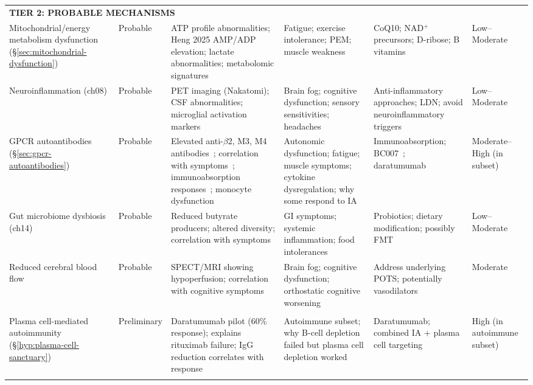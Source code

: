 \begin{landscape}
\begin{longtable}{p{2.8cm}p{1.8cm}p{4.3cm}p{4.3cm}p{3.9cm}p{2.2cm}}
\multicolumn{6}{l}{\textbf{TIER 2: PROBABLE MECHANISMS}} \\
\addlinespace

Mito\-chon\-drial/\allowbreak energy meta\-bolism dys\-func\-tion (\S\ref{sec:mitochondrial-dysfunction}) & Prob\-able & ATP profile ab\-nor\-mal\-ities; Heng 2025 AMP/\allowbreak ADP ele\-va\-tion; lac\-tate ab\-nor\-mal\-ities; meta\-bolomic sig\-na\-tures & Fa\-tigue; ex\-er\-cise in\-tol\-er\-ance; PEM; mus\-cle weak\-ness & CoQ10; NAD$^+$ pre\-cur\-sors; D-ri\-bose; B vi\-ta\-mins & Low--Moderate \\
\addlinespace

Neuroinflammation (ch08) & Probable & PET imaging (Nakatomi); CSF abnormalities; microglial activation markers & Brain fog; cognitive dysfunction; sensory sensitivities; headaches & Anti-inflammatory approaches; LDN; avoid neuroinflammatory triggers & Low--Moderate \\
\addlinespace

GPCR auto\-anti\-bodies (\S\ref{sec:gpcr-autoantibodies}) & Prob\-able & El\-e\-vat\-ed anti-$\beta$2, M3, M4 anti\-bodies~\cite{Loebel2016,Bynke2020}; cor\-re\-la\-tion with symp\-toms~\cite{Sotzny2021}; im\-mu\-no\-ab\-sorp\-tion re\-sponses~\cite{Stein2024immunoadsorption}; mono\-cyte dys\-func\-tion~\cite{Hackel2025monocyte} & Au\-to\-nom\-ic dys\-func\-tion; fa\-tigue; mus\-cle symp\-toms; cy\-to\-kine dys\-reg\-u\-la\-tion; why some re\-spond to IA & Im\-mu\-no\-ab\-sorp\-tion; BC007~\cite{Hohberger2021bc007}; dar\-atu\-mu\-mab~\cite{Fluge2025daratumumab} & Moderate--High (in subset) \\
\addlinespace

Gut microbiome dysbiosis (ch14) & Probable & Reduced butyrate producers; altered diversity; correlation with symptoms & GI symptoms; systemic inflammation; food intolerances & Probiotics; dietary modification; possibly FMT & Low--Moderate \\
\addlinespace

Reduced cerebral blood flow & Probable & SPECT/MRI showing hypoperfusion; correlation with cognitive symptoms & Brain fog; cognitive dysfunction; orthostatic cognitive worsening & Address underlying POTS; potentially vasodilators & Moderate \\
\addlinespace

\multicolumn{6}{l}{\textbf{TIER 3: PRELIMINARY/EMERGING}} \\
\addlinespace

Plasma cell-mediated auto\-immunity (\S\ref{hyp:plasma-cell-sanctuary}) & Preliminary & Daratu\-mumab pilot (60\% response); explains rituximab failure; IgG reduction correlates with response & Auto\-immune subset; why B-cell depletion failed but plasma cell depletion worked & Daratu\-mumab; combined IA + plasma cell targeting & High (in auto\-immune subset) \\
\addlinespace


\end{longtable}
\end{landscape}
